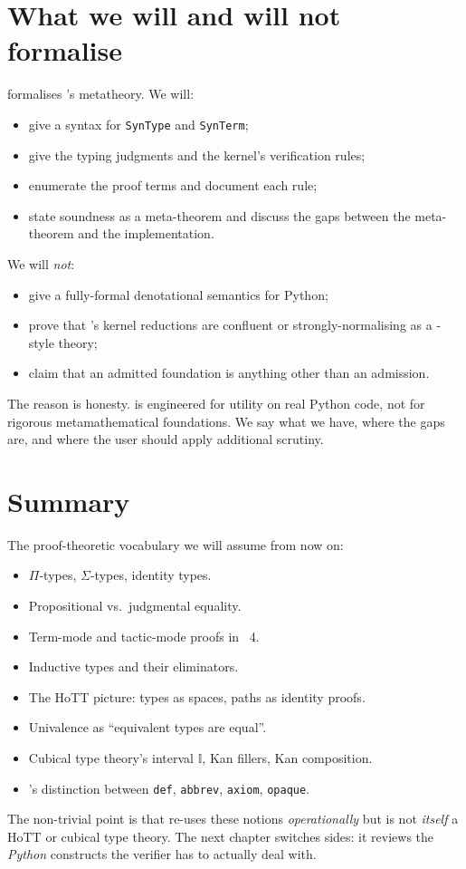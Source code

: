 \section{What we will and will not formalise}
\label{sec:formalise-scope}

 formalises \Deppy{}'s metatheory.  We will:
\begin{itemize}[leftmargin=1.7em]
  \item give a syntax for \texttt{SynType} and \texttt{SynTerm};
  \item give the typing judgments and the kernel's verification
    rules;
  \item enumerate the proof terms and document each rule;
  \item state soundness as a meta-theorem and discuss the gaps
    between the meta-theorem and the implementation.
\end{itemize}

We will \emph{not}:
\begin{itemize}[leftmargin=1.7em]
  \item give a fully-formal denotational semantics for Python;
  \item prove that \Deppy{}'s kernel reductions are confluent or
    strongly-normalising as a \CIC{}-style theory;
  \item claim that an admitted foundation is anything other than an
    admission.
\end{itemize}

The reason is honesty.  \Deppy{} is engineered for utility on
real Python code, not for rigorous metamathematical foundations.  We
say what we have, where the gaps are, and where the user should
apply additional scrutiny.

\section{Summary}
\label{sec:ch2-summary}

The proof-theoretic vocabulary we will assume from now on:
\begin{itemize}[leftmargin=1.7em]
  \item $\Pi$-types, $\Sigma$-types, identity types.
  \item Propositional vs.\ judgmental equality.
  \item Term-mode and tactic-mode proofs in \Lean{}~4.
  \item Inductive types and their eliminators.
  \item The HoTT picture: types as spaces, paths as identity proofs.
  \item Univalence as ``equivalent types are equal''.
  \item Cubical type theory's interval $\mathbb{I}$, Kan fillers, Kan
    composition.
  \item \Lean's distinction between \texttt{def}, \texttt{abbrev},
    \texttt{axiom}, \texttt{opaque}.
\end{itemize}

The non-trivial point is that \Deppy{} re-uses these notions
\emph{operationally} but is not \emph{itself} a HoTT or cubical type
theory.  The next chapter switches sides: it reviews the \emph{Python}
constructs the verifier has to actually deal with.
